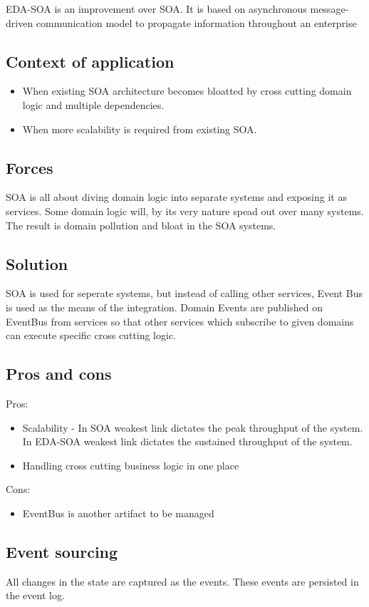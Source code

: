 \documentclass[12pt, a4paper]{article}
\begin{document}
EDA-SOA is an improvement over SOA. It is based on asynchronous message-driven communication model to propagate information throughout an enterprise

\subsection{Context of application}
\begin{itemize}
\item When existing SOA architecture becomes bloatted by cross cutting domain logic and multiple dependencies.
\item When more scalability is required from existing SOA.
\end{itemize}

\subsection{Forces}
SOA is all about diving domain logic into separate systems and exposing it as services. Some domain logic will, by its very nature spead out over many systems. The result is domain pollution and bloat in the SOA systems.

\subsection{Solution}
SOA is used for seperate systems, but instead of calling other services, Event Bus is used as the means of the integration. Domain Events are published on EventBus from services so that other services which subscribe to given domains can execute specific cross cutting logic.

\subsection{Pros and cons}
Pros:
\begin{itemize}
  \item Scalability - In SOA weakest link dictates the peak throughput of the system. In EDA-SOA weakest link dictates the sustained throughput of the system. 
  \item Handling cross cutting business logic in one place
\end{itemize}
Cons:
\begin{itemize}
  \item EventBus is another artifact to be managed
\end{itemize}

\subsection{Event sourcing}
All changes in the state are captured as the events. These events are persisted in the event log.
\end{document}
